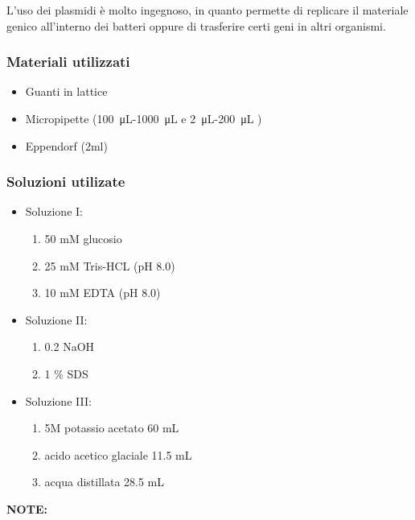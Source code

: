 L'uso dei plasmidi è molto ingegnoso, in quanto permette di replicare il materiale genico all'interno dei batteri
oppure di trasferire certi geni in altri organismi.


\subsubsection{Materiali utilizzati}

\begin{itemize}
	\item Guanti in lattice
	\item Micropipette (\SI{100}{\micro\liter}-\SI{1000}{\micro\liter} e \SI{2}{\micro\liter}-\SI{200}{\micro\liter}  )
	\item Eppendorf (2ml)
\end{itemize}


\subsubsection{Soluzioni utilizate}

\begin{itemize}

	\item Soluzione I:
  \begin{enumerate}
    \item 50 mM glucosio
    \item 25 mM Tris-HCL (pH 8.0)
    \item 10 mM EDTA (pH 8.0)
  \end{enumerate}
	\item Soluzione II:
  \begin{enumerate}
    \item 0.2 NaOH
    \item 1 \% SDS
  \end{enumerate}
	\item Soluzione III:
  \begin{enumerate}
    \item 5M potassio acetato 60 mL
    \item acido acetico glaciale 11.5 mL
    \item acqua distillata 28.5 mL
  \end{enumerate}

\end{itemize}

\vspace{0.5cm}

\textbf{NOTE:}

